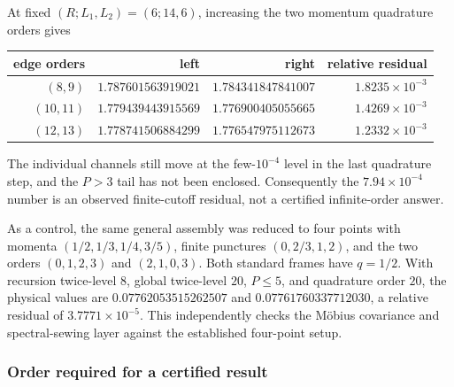 \documentclass[11pt]{article}
\begin{document}
At fixed \((R;L_1,L_2)=(6;14,6)\), increasing the two momentum quadrature
orders gives
\begin{center}
\small
\begin{tabular}{@{}rrrr@{}}
\toprule
edge orders & left & right & relative residual\\
\midrule
\((8,9)\)   & \(1.787601563919021\) & \(1.784341847841007\)
             & \(1.8235\times10^{-3}\)\\
\((10,11)\) & \(1.779439443915569\) & \(1.776900405055665\)
             & \(1.4269\times10^{-3}\)\\
\((12,13)\) & \(1.778741506884299\) & \(1.776547975112673\)
             & \(1.2332\times10^{-3}\)\\
\bottomrule
\end{tabular}
\end{center}
The individual channels still move at the few-\(10^{-4}\) level in the last
quadrature step, and the \(P>3\) tail has not been enclosed.  Consequently
the \(7.94\times10^{-4}\) number is an observed finite-cutoff residual, not
a certified infinite-order answer.

As a control, the same general assembly was reduced to four points with
momenta \((1/2,1/3,1/4,3/5)\), finite punctures
\((0,2/3,1,2)\), and the two orders \((0,1,2,3)\) and
\((2,1,0,3)\).  Both standard frames have \(q=1/2\).  With recursion
twice-level \(8\), global twice-level \(20\), \(P\leq5\), and quadrature
order \(20\), the physical values are \(0.07762053515262507\) and
\(0.07761760337712030\), a relative residual of
\(3.7771\times10^{-5}\).  This independently checks the M\"obius covariance
and spectral-sewing layer against the established four-point setup.

\subsubsection{Order required for a certified result}
\label{sec:fivepoint-certification-order}
\end{document}
